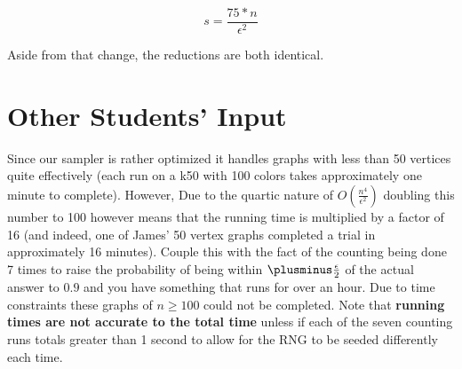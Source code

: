 \documentclass[12]{article}
\begin{document}
\[ s = \frac{75*n}{\epsilon^2} \]

Aside from that change, the reductions are both identical.

\section{Other Students' Input}
Since our sampler is rather optimized it handles graphs with less than 50 vertices quite effectively (each run on a k50 with 100 colors takes approximately one minute to complete). However, Due to the quartic nature of $O(\frac{n^4}{\epsilon^2})$ doubling this number to 100 however means that the running time is multiplied by a factor of 16 (and indeed, one of James' 50 vertex graphs completed a trial in approximately 16 minutes). Couple this with the fact of the counting being done 7 times to raise the probability of being within $\plusminus \frac{\epsilon}{2}$ of the actual answer to $0.9$ and you have something that runs for over an hour. Due to time constraints these graphs of $n \geq 100$ could not be completed. Note that \textbf{running times are not accurate to the total time} unless if each of the seven counting runs totals greater than 1 second to allow for the RNG to be seeded differently each time.
\end{document}
